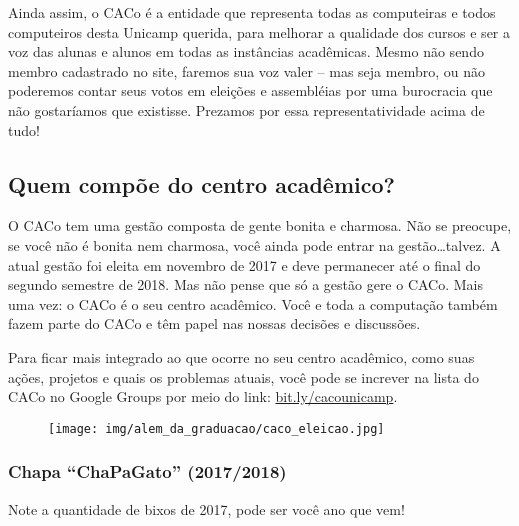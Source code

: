 Ainda assim, o CACo é a entidade que representa todas as computeiras e todos
computeiros desta Unicamp querida, para melhorar a qualidade dos cursos e ser a
voz das alunas e alunos em todas as instâncias acadêmicas. Mesmo não sendo
membro cadastrado no site, faremos sua voz valer -- mas seja membro, ou não
poderemos contar seus votos em eleições e assembléias por uma burocracia que
não gostaríamos que existisse. Prezamos por essa representatividade acima de
tudo!

\subsection{Quem compõe do centro acadêmico?}

O CACo tem uma gestão composta de gente bonita e charmosa. Não se preocupe, se
você não é bonita nem charmosa, você ainda pode entrar na gestão\dots talvez. A
atual gestão foi eleita em novembro de 2017 e deve permanecer até o final do
segundo semestre de 2018. Mas não pense que só a gestão gere o CACo. Mais uma
vez: o CACo é o seu centro acadêmico. Você e toda a computação também fazem
parte do CACo e têm papel nas nossas decisões e discussões.

Para ficar mais integrado ao que ocorre no seu centro acadêmico, como suas
ações, projetos e quais os problemas atuais, você pode se increver na lista do
CACo no Google Groups por meio do link:
\url{bit.ly/cacounicamp}.

\begin{figure}[H]
  \centering
  \texttt{[image: img/alem\_da\_graduacao/caco\_eleicao.jpg]}
\end{figure}

\subsubsection{Chapa ``ChaPaGato'' (2017/2018)}

Note a quantidade de bixos de 2017, pode ser você ano que vem!

